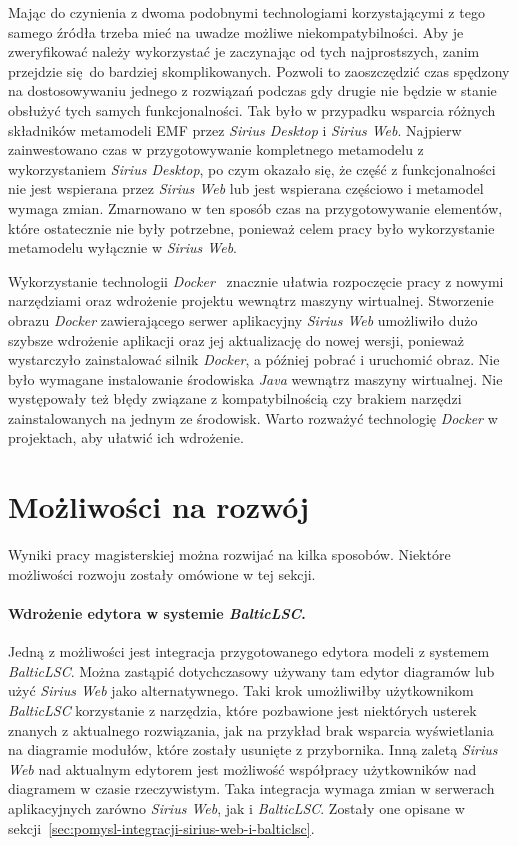 Mając do czynienia z dwoma podobnymi technologiami korzystającymi z tego samego
źródła trzeba mieć na uwadze możliwe niekompatybilności. Aby je zweryfikować
należy wykorzystać je zaczynając od tych najprostszych, zanim przejdzie się do
bardziej skomplikowanych. Pozwoli to zaoszczędzić czas spędzony na
dostosowywaniu jednego z rozwiązań podczas gdy drugie nie będzie w stanie
obsłużyć tych samych funkcjonalności. Tak było w przypadku wsparcia różnych
składników metamodeli \gls{EMF} przez \emph{Sirius Desktop} i \emph{Sirius
	Web}. Najpierw zainwestowano czas w przygotowywanie kompletnego
metamodelu z
wykorzystaniem \emph{Sirius Desktop}, po czym okazało się, że część z
funkcjonalności nie jest wspierana przez \emph{Sirius Web} lub jest wspierana
częściowo i metamodel wymaga zmian. Zmarnowano w ten sposób czas na
przygotowywanie elementów, które ostatecznie nie były potrzebne, ponieważ celem
pracy było wykorzystanie metamodelu wyłącznie w \emph{Sirius Web}.

Wykorzystanie technologii \emph{Docker}~\cite{wikipedia-docker} znacznie
ułatwia rozpoczęcie pracy z
nowymi narzędziami oraz wdrożenie projektu wewnątrz maszyny wirtualnej.
Stworzenie obrazu \emph{Docker} zawierającego serwer aplikacyjny \emph{Sirius
	Web} umożliwiło dużo szybsze wdrożenie aplikacji oraz jej aktualizację
do nowej
wersji, ponieważ wystarczyło zainstalować silnik \emph{Docker}, a później
pobrać i uruchomić obraz. Nie było wymagane instalowanie środowiska \emph{Java}
wewnątrz maszyny wirtualnej. Nie występowały też błędy związane z
kompatybilnością czy brakiem narzędzi zainstalowanych na jednym ze środowisk.
Warto rozważyć technologię \emph{Docker} w projektach, aby ułatwić ich
wdrożenie.

\section{Możliwości na rozwój}

Wyniki pracy magisterskiej można rozwijać na kilka sposobów. Niektóre
możliwości rozwoju zostały omówione w tej sekcji.

\paragraph{Wdrożenie edytora w systemie \emph{BalticLSC}.}
Jedną z możliwości jest integracja przygotowanego edytora modeli z systemem
\emph{BalticLSC}. Można zastąpić dotychczasowy używany tam edytor diagramów lub
użyć \emph{Sirius Web} jako alternatywnego. Taki krok umożliwiłby użytkownikom
\emph{BalticLSC} korzystanie z narzędzia, które pozbawione jest niektórych
usterek znanych z aktualnego rozwiązania, jak na przykład brak wsparcia
wyświetlania na diagramie modułów, które zostały usunięte z przybornika.
Inną zaletą \emph{Sirius Web} nad aktualnym edytorem jest możliwość współpracy
użytkowników nad diagramem w czasie rzeczywistym. Taka integracja wymaga zmian
w serwerach aplikacyjnych zarówno \emph{Sirius Web}, jak i \emph{BalticLSC}.
Zostały one opisane w
sekcji~\ref{sec:pomysl-integracji-sirius-web-i-balticlsc}.

